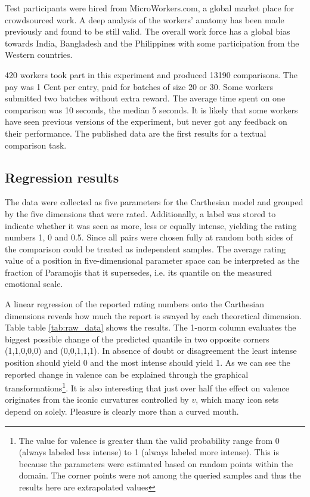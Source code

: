 Test participants were hired from MicroWorkers.com, a global market place for crowdsourced work.
A deep analysis of the workers' anatomy has been made previously and found to be still valid\cite{microworkers}.
The overall work force has a global bias towards India, Bangladesh and the Philippines with some participation
from the Western countries.

420 workers took part in this experiment and produced 13190 comparisons.
The pay was 1 Cent per entry, paid for batches of size 20 or 30. Some workers submitted two batches without extra reward.
The average time spent on one comparison was 10 seconds, the median 5 seconds.
It is likely that some workers have seen previous versions of the experiment, but never got any feedback on their performance.
The published data are the first results for a textual comparison task.

\subsection{Regression results}

The data were collected as five parameters for the Carthesian model and grouped by the
five dimensions that were rated. Additionally, a label was
stored to indicate whether it was seen as more, less or equally intense, yielding the rating numbers 1, 0 and 0.5.
Since all pairs were chosen fully at random
both sides of the comparison could be treated as independent samples. The average rating value of a
position in five-dimensional parameter space can be interpreted as the fraction of
Paramojis that it supersedes, i.e. its quantile on the measured emotional scale.

A linear regression of the reported rating numbers onto the Carthesian dimensions reveals
how much the report is swayed by each
theoretical dimension. Table table \ref{tab:raw_data} shows the results.
The 1-norm column evaluates the biggest possible change of the predicted quantile in two opposite corners (1,1,0,0,0) and (0,0,1,1,1).
In absence of doubt or disagreement the least intense position should yield 0 and the most intense should yield 1.
As we can see the reported change in valence can be explained through the graphical transformations\footnote{
The value for valence is greater than the valid probability range from 0 (always labeled less intense) to 1 (always labeled more intense).
This is because the parameters were estimated based on random points within the domain.
The corner points were not among the queried samples and thus the results here are extrapolated values}.
It is also interesting that just over half the effect on valence originates from the iconic curvatures controlled by $v$,
which many icon sets depend on solely. Pleasure is clearly more than a curved mouth.

